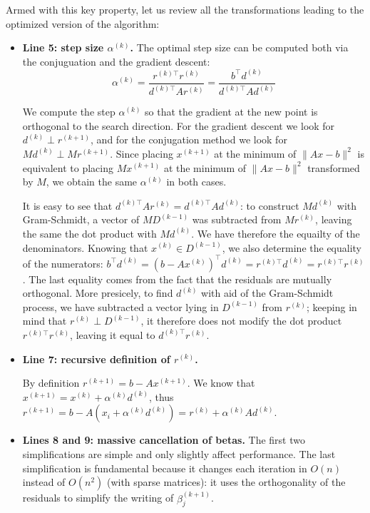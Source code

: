 \documentclass[notitlepage,oneside]{book}
\begin{document}
Armed with this key property, let us review all the transformations leading to the optimized version of the algorithm:
\begin{itemize}
\item \textbf{Line 5: step size $\alpha^{(k)}$.} The optimal step size can be computed both via the conjuguation and the gradient descent:
$$\boxed{\alpha^{(k)}=\frac{r^{(k)\top}r^{(k)}}{d^{(k)\top}Ar^{(k)}} =\frac{b^\top d^{(k)}}{d^{(k)\top}Ad^{(k)}}}$$

We compute the step $\alpha^{(k)}$ so that the gradient at the new point is orthogonal to the search direction.
For the gradient descent we look for $d^{(k)}\perp r^{(k+1)}$, and for the conjugation method we look for $Md^{(k)}\perp Mr^{(k+1)}$.
Since placing $x^{(k+1)}$ at the minimum of $\|Ax-b\|^2$ is equivalent to placing $Mx^{(k+1)}$ at the minimum of $\|Ax-b\|^2$ transformed by $M$, 
we obtain the same $\alpha^{(k)}$ in both cases.

It is easy to see that $d^{(k)\top}Ar^{(k)} = d^{(k)\top}Ad^{(k)}$:
to construct $Md^{(k)}$ with Gram-Schmidt, a vector of $MD^{(k-1)}$ was subtracted from $Mr^{(k)}$, leaving the same the dot product with $Md^{(k)}$.
We have therefore the equailty of the denominators.
Knowing that $x^{(k)}\in D^{(k-1)}$, we also determine the equality of the numerators: 
$ b^\top d^{(k)} =(b-Ax^{(k)})^\top d^{(k)} = r^{(k)\top}d^{(k)}=r^{(k)\top}r^{(k)}$.
The last equality comes from the fact that the residuals are mutually orthogonal.
More presicely, to find $d^{(k)}$ with aid of the Gram-Schmidt process, we have subtracted a vector lying in $D^{(k-1)}$ from $r^{(k)}$;
keeping in mind that $r^{(k)}\perp D^{(k-1)}$, it therefore does not modify the dot product $r^{(k)\top} r^{(k)}$, leaving it equal to $d^{(k)\top} r^{(k)}$.

\item \textbf{Line 7: recursive definition of $r^{(k)}$.} 

By definition $r^{(k+1)} = b-Ax^{(k+1)}$. We know that $x^{(k+1)} = x^{(k)}+\alpha^{(k)} d^{(k)}$, thus $r^{(k+1)} = b-A(x_i+\alpha^{(k)} d^{(k)}) = r^{(k)} + \alpha^{(k)} A d^{(k)}$.

\item \textbf{Lines 8 and 9: massive cancellation of betas.}
The first two simplifications are simple and only slightly affect performance.
The last simplification is fundamental because it changes each iteration in $O(n)$ instead of $O(n^2)$ (with sparse matrices):
it uses the orthogonality of the residuals to simplify the writing of $\beta^{(k+1)}_j$.


\end{itemize}
\end{document}
